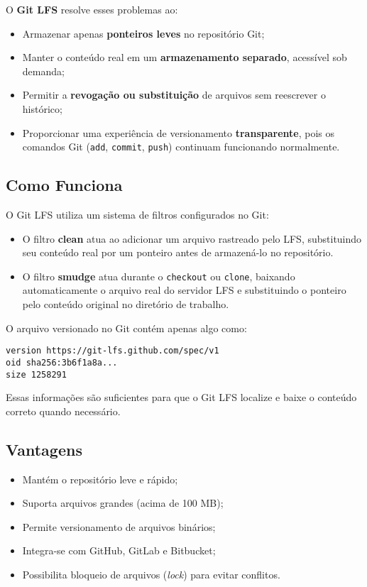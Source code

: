 O \textbf{Git LFS} resolve esses problemas ao:
\begin{itemize}
  \item Armazenar apenas \textbf{ponteiros leves} no repositório Git;
  \item Manter o conteúdo real em um \textbf{armazenamento separado}, acessível sob demanda;
  \item Permitir a \textbf{revogação ou substituição} de arquivos sem reescrever o histórico;
  \item Proporcionar uma experiência de versionamento \textbf{transparente}, pois os comandos Git (\texttt{add}, \texttt{commit}, \texttt{push}) continuam funcionando normalmente.
\end{itemize}

\subsection{Como Funciona}

O Git LFS utiliza um sistema de filtros configurados no Git:
\begin{itemize}
  \item O filtro \textbf{clean} atua ao adicionar um arquivo rastreado pelo LFS, substituindo seu conteúdo real por um ponteiro antes de armazená-lo no repositório.
  \item O filtro \textbf{smudge} atua durante o \texttt{checkout} ou \texttt{clone}, baixando automaticamente o arquivo real do servidor LFS e substituindo o ponteiro pelo conteúdo original no diretório de trabalho.
\end{itemize}

O arquivo versionado no Git contém apenas algo como:

\begin{verbatim}
version https://git-lfs.github.com/spec/v1
oid sha256:3b6f1a8a...
size 1258291
\end{verbatim}

Essas informações são suficientes para que o Git LFS localize e baixe o conteúdo correto quando necessário.

\subsection{Vantagens}

\begin{itemize}
  \item Mantém o repositório leve e rápido;
  \item Suporta arquivos grandes (acima de 100 MB);
  \item Permite versionamento de arquivos binários;
  \item Integra-se com GitHub, GitLab e Bitbucket;
  \item Possibilita bloqueio de arquivos (\textit{lock}) para evitar conflitos.
\end{itemize}

